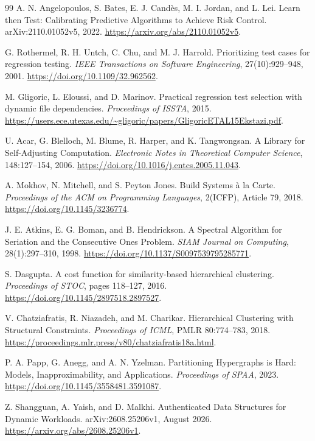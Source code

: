 \documentclass[10pt,journal,compsoc]{IEEEtran}
\theoremstyle{definition}\newtheorem{definition}[theorem]{Definition}
\begin{document}
\begin{thebibliography}{99}
 A. N. Angelopoulos, S. Bates, E. J. Cand\`es, M. I. Jordan, and L. Lei. Learn then Test: Calibrating Predictive Algorithms to Achieve Risk Control. arXiv:2110.01052v5, 2022. \url{https://arxiv.org/abs/2110.01052v5}.

 G. Rothermel, R. H. Untch, C. Chu, and M. J. Harrold. Prioritizing test cases for regression testing. \emph{IEEE Transactions on Software Engineering}, 27(10):929--948, 2001. \url{https://doi.org/10.1109/32.962562}.

 M. Gligoric, L. Eloussi, and D. Marinov. Practical regression test selection with dynamic file dependencies. \emph{Proceedings of ISSTA}, 2015. \url{https://users.ece.utexas.edu/~gligoric/papers/GligoricETAL15Ekstazi.pdf}.

 U. Acar, G. Blelloch, M. Blume, R. Harper, and K. Tangwongsan. A Library for Self-Adjusting Computation. \emph{Electronic Notes in Theoretical Computer Science}, 148:127--154, 2006. \url{https://doi.org/10.1016/j.entcs.2005.11.043}.

 A. Mokhov, N. Mitchell, and S. Peyton Jones. Build Systems \`a la Carte. \emph{Proceedings of the ACM on Programming Languages}, 2(ICFP), Article 79, 2018. \url{https://doi.org/10.1145/3236774}.

 J. E. Atkins, E. G. Boman, and B. Hendrickson. A Spectral Algorithm for Seriation and the Consecutive Ones Problem. \emph{SIAM Journal on Computing}, 28(1):297--310, 1998. \url{https://doi.org/10.1137/S0097539795285771}.

 S. Dasgupta. A cost function for similarity-based hierarchical clustering. \emph{Proceedings of STOC}, pages 118--127, 2016. \url{https://doi.org/10.1145/2897518.2897527}.

 V. Chatziafratis, R. Niazadeh, and M. Charikar. Hierarchical Clustering with Structural Constraints. \emph{Proceedings of ICML}, PMLR 80:774--783, 2018. \url{https://proceedings.mlr.press/v80/chatziafratis18a.html}.

 P. A. Papp, G. Anegg, and A. N. Yzelman. Partitioning Hypergraphs is Hard: Models, Inapproximability, and Applications. \emph{Proceedings of SPAA}, 2023. \url{https://doi.org/10.1145/3558481.3591087}.

 Z. Shangguan, A. Yaish, and D. Malkhi. Authenticated Data Structures for Dynamic Workloads. arXiv:2608.25206v1, August 2026. \url{https://arxiv.org/abs/2608.25206v1}.
\end{thebibliography}
\end{document}
